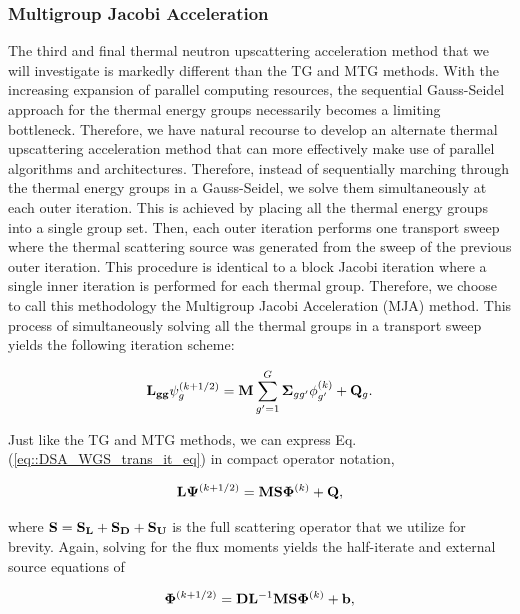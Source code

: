 \subsubsection{Multigroup Jacobi Acceleration}
\label{sec:DSA_DSA_MG_WGS}

The third and final thermal neutron upscattering acceleration method that we will investigate is markedly different than the TG and MTG methods. With the increasing expansion of parallel computing resources, the sequential Gauss-Seidel approach for the thermal energy groups necessarily becomes a limiting bottleneck. Therefore, we have natural recourse to develop an alternate thermal upscattering acceleration method that can more effectively make use of parallel algorithms and architectures. Therefore, instead of sequentially marching through the thermal energy groups in a Gauss-Seidel, we solve them simultaneously at each outer iteration. This is achieved by placing all the thermal energy groups into a single group set. Then, each outer iteration performs one transport sweep where the thermal scattering source was generated from the sweep of the previous outer iteration. This procedure is identical to a block Jacobi iteration where a single inner iteration is performed for each thermal group. Therefore, we choose to call this methodology the Multigroup Jacobi Acceleration (MJA) method. This process of simultaneously solving all the thermal groups in a transport sweep yields the following iteration scheme:

\begin{equation}
\label{eq::DSA_WGS_trans_it_eq}
{\bf L_{gg}} \psi_g^{(k+1/2)} =  {\bf M} \sum_{g'=1}^G {\bf \Sigma}_{g g'} \phi_{g'}^{(k)} + {\bf Q}_g .
\end{equation}

\noindent Just like the TG and MTG methods, we can express Eq. (\ref{eq::DSA_WGS_trans_it_eq}) in compact operator notation,

\begin{equation}
\label{eq::DSA_WGS_trans_it_eq_ops}
{\bf L} {\bf \Psi}^{(k+1/2)} = {\bf M} {\bf S}  {\bf \Phi}^{(k)} + {\bf Q} ,
\end{equation}

\noindent where ${\bf S} = {\bf S_{L}} + {\bf S_{D}} + {\bf S_{U}}$ is the full scattering operator that we utilize for brevity. Again, solving for the flux moments yields the half-iterate and external source equations of

\begin{equation}
\label{eq::DSA_MGJac_half_it_sol}
{\bf \Phi}^{(k+1/2)} = {\bf D}{\bf L}^{-1}  {\bf M} {\bf S} {\bf \Phi}^{(k)} + {\bf b} ,
\end{equation}

